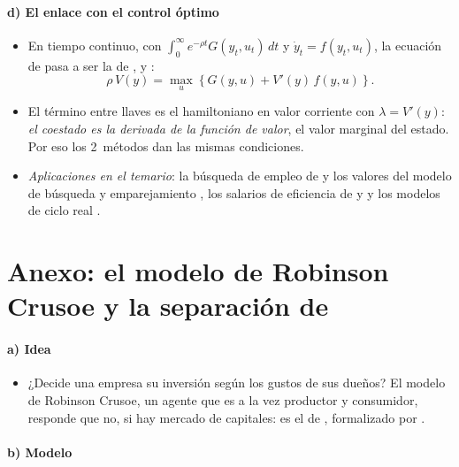 \documentclass[11pt]{article}
\begin{document}
\paragraph{d) El enlace con el control óptimo}

\begin{itemize}
\item En tiempo continuo, con $\int_0^{\infty}e^{-\rho t}G(y_t,u_t)\,dt$ y $\dot y_t=f(y_t,u_t)$, la ecuación de  pasa a ser la de ,  y :
  \begin{equation*}
  \rho\,V(y)=\max_u\left\{G(y,u)+V'(y)\,f(y,u)\right\}.
  \end{equation*}
\item El término entre llaves es el hamiltoniano en valor corriente con $\lambda=V'(y)$: \emph{el coestado es la derivada de la función de valor}, el valor marginal del estado. Por eso los 2~métodos dan las mismas condiciones. \findemo
\item \emph{Aplicaciones en el temario}: la búsqueda de empleo de  y los valores del modelo de búsqueda y emparejamiento , los salarios de eficiencia de  y   y los modelos de ciclo real .
\end{itemize}

\section{Anexo: el modelo de Robinson Crusoe\cortetitulo{} y la separación de }\label{anexo:robinson}

\paragraph{a) Idea}

\begin{itemize}
\item ¿Decide una empresa su inversión según los gustos de sus dueños? El modelo de Robinson Crusoe, un agente que es a la vez productor y consumidor, responde que no, si hay mercado de capitales: es el  de \textcite{Fisher1930Theory}, formalizado por \textcite{Hirshleifer1958Optimal}.
\end{itemize}

\paragraph{b) Modelo}
\end{document}
